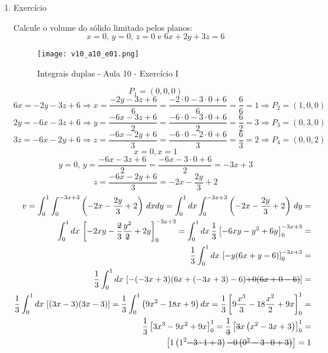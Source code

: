 \begin{enumerate}
	\item Exercício
	
	Calcule o volume do sólido limitado pelos planos:
	\begin{equation*}
		x = 0,\, y = 0,\, z = 0 \textrm{ e } 6x + 2y + 3z = 6
	\end{equation*}
	
	\begin{figure}[htb]
		\caption{Integrais duplas - Aula 10 - Exercício I}
		\label{v10_a10_e01}
		\centering
		\texttt{[image: v10\_a10\_e01.png]}		
	\end{figure}
	
	\begin{equation*}
		P_1 = (0, 0 , 0)	
	\end{equation*}
	\begin{equation*}
		6x = -2y - 3z + 6 \Rightarrow x = \dfrac{-2y - 3z + 6}{6} = \dfrac{-2\cdot0 - 3\cdot0 + 6}{6} = \dfrac{6}{6} = 1 \Rightarrow P_2 = (1,0,0)
	\end{equation*}
	\begin{equation*}
		2y = -6x - 3z + 6 \Rightarrow y = \dfrac{-6x - 3z + 6}{2} = \dfrac{-6\cdot0 - 3\cdot0 + 6}{2} = \dfrac{6}{2} = 3 \Rightarrow P_3 = (0,3,0)
	\end{equation*}
	\begin{equation*}
		3z = -6x - 2y + 6 \Rightarrow z = \dfrac{-6x - 2y + 6}{3} = \dfrac{-6\cdot0 - 2\cdot0 + 6}{3} = \dfrac{6}{3} = 2 \Rightarrow P_4 = (0,0,2)
	\end{equation*}
	\begin{equation*}
		x = 0, x = 1
	\end{equation*}
	\begin{equation*}
		y = 0,\, y = \dfrac{-6x - 3z + 6}{2} = \dfrac{-6x - 3\cdot0 + 6}{2} = -3x + 3
	\end{equation*}
	\begin{equation*}
		z = \dfrac{-6x - 2y + 6}{3} = -2x - \dfrac{2y}{3} + 2
	\end{equation*}
	\begin{align*}
		v = \int_0^1 \int_0^{-3x + 3} \left(-2x - \dfrac{2y}{3} + 2\right)\, dx dy = \int_0^1 dx \int_0^{-3x + 3} \left(-2x - \dfrac{2y}{3} + 2\right)\, dy =\\ \int_0^1 dx\, \left[-2xy - \dfrac{\overstrike{2}}{3}\dfrac{y^2}{\overstrike{2}} + 2y\right]_0^{-3x + 3} = \int_0^1 dx\, \dfrac{1}{3}\left[-6xy - y^2 + 6y\right]_0^{-3x + 3} =\\ \dfrac{1}{3}\int_0^1 dx\, \left[-y(6x + y - 6)\right]_0^{-3x + 3} =\\ \dfrac{1}{3}\int_0^1 dx\, \left[-(-3x + 3)(6x + (-3x + 3) - 6) \overstrike{+ 0(6x + 0 - 6)}\right] =\\ \dfrac{1}{3}\int_0^1 dx\, \left[(3x-3)(3x - 3)\right] = \dfrac{1}{3}\int_0^1 \left(9x^2 - 18x + 9\right) dx = \dfrac{1}{3}\left[9\dfrac{x^3}{3} - 18 \dfrac{x^2}{2} + 9x\right]_0^1 =\\ \dfrac{1}{3} \left[3x^3 - 9x^2 + 9x\right]_0^1 = \dfrac{1}{\overstrike{3}} \left[\overstrike{3}x\left(x^2 - 3x + 3\right)\right]_0^1 =\\ \left[1\left(1^2 \overstrike{- 3\cdot1 + 3}\right) \overstrike{- 0\left(0^2 - 3\cdot0 + 3\right)}\right] = 1	

\end{align*}
\end{enumerate}
